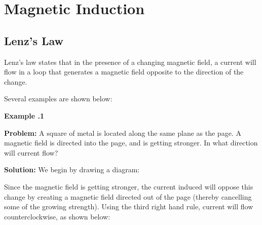 \chapter{Magnetic Induction} \label{chap:MagneticInduction}
	\section{Lenz's Law}
	
	Lenz's law states that in the presence of a changing magnetic field, a current will flow in a loop that generates a magnetic field opposite to the direction of the change.  
	
	
	Several examples are shown below: 
	
	\begin{mdframed}[backgroundcolor=blue!10!white]
		\begin{center}
			
			
			\textbf{Example \thesection.1}	
		\end{center}
		
		\textbf{Problem: }A square of metal is located along the same plane as the page.  A magnetic field is directed into the page, and is getting stronger.  In what direction will current flow?  
		
		\textbf{Solution:} We begin by drawing a diagram:
		
		\begin{center}
		\end{center}
		
Since the magnetic field is getting stronger, the current induced will oppose this change by creating a magnetic field directed out of the page (thereby cancelling some of the growing strength).  Using the third right hand rule, current will flow counterclockwise, as shown below: 
	

\end{mdframed}

